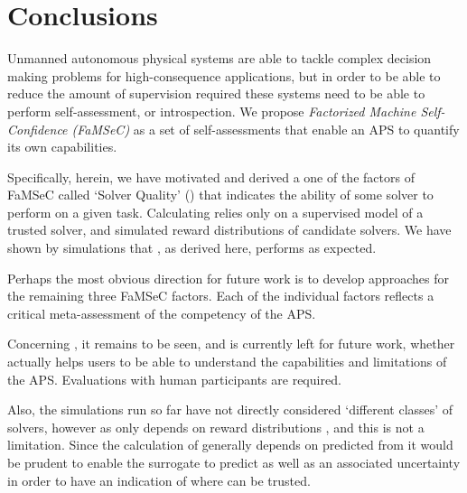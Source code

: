 \section{Conclusions}
Unmanned autonomous physical systems are able to tackle complex decision making problems for high-consequence applications, but in order to be able to reduce the amount of supervision required these systems need to be able to perform self-assessment, or introspection. We propose \emph{Factorized Machine Self-Confidence (FaMSeC)} as a set of self-assessments that enable an APS to quantify its own capabilities.

Specifically, herein, we have motivated and derived a one of the factors of FaMSeC called `Solver Quality' (\xQ) that indicates the ability of some solver to perform on a given task. Calculating \xQ{} relies only on a supervised model of a trusted solver, and simulated reward distributions of candidate solvers. We have shown by simulations that \xQ{}, as derived here, performs as expected.

Perhaps the most obvious direction for future work is to develop approaches for the remaining three FaMSeC factors. Each of the individual factors reflects a critical meta-assessment of the competency of the APS.

Concerning \xQ{}, it remains to be seen, and is currently left for future work, whether \xQ{} actually helps users to be able to understand the capabilities and limitations of the APS. Evaluations with human participants are required.

Also, the simulations run so far have not directly considered `different classes' of solvers, however as \xQ{} only depends on reward distributions \rwd{}, and \rwdstar{} this is not a limitation. Since the calculation of \xQ{} generally depends on \rwdstar{} predicted from \surrogate{} it would be prudent to enable the surrogate to predict \rwdstar{} as well as an associated uncertainty in order to have an indication of where \surrogate{} can be trusted.
